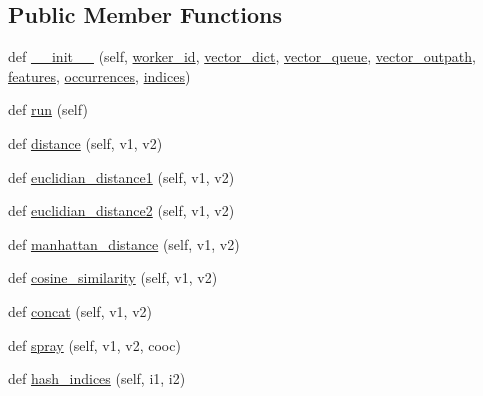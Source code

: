 \subsection*{Public Member Functions}
\begin{DoxyCompactItemize}
\item 
def \hyperlink{classsrc_1_1mapping_1_1mapthreading_1_1_mapping_worker_thread_a369abd1822eee49c2a800bf80939ca63}{\+\_\+\+\_\+init\+\_\+\+\_\+} (self, \hyperlink{classsrc_1_1mapping_1_1mapthreading_1_1_mapping_worker_thread_a31a9d651719e7dc0c3c0655885b057f1}{worker\+\_\+id}, \hyperlink{classsrc_1_1mapping_1_1mapthreading_1_1_mapping_worker_thread_a3b681382a138a5eee92f956792f96445}{vector\+\_\+dict}, \hyperlink{classsrc_1_1mapping_1_1mapthreading_1_1_mapping_worker_thread_a64f7aadd3ef3abd74551927eaddad44c}{vector\+\_\+queue}, \hyperlink{classsrc_1_1mapping_1_1mapthreading_1_1_mapping_worker_thread_a9ee70fb431a73f6600fa8d9fcfbb1789}{vector\+\_\+outpath}, \hyperlink{classsrc_1_1mapping_1_1mapthreading_1_1_mapping_worker_thread_aef3a19d93efa561529cd8c119dd64e8d}{features}, \hyperlink{classsrc_1_1mapping_1_1mapthreading_1_1_mapping_worker_thread_a8d87ef19617f8a43ff093a075ddc6f57}{occurrences}, \hyperlink{classsrc_1_1mapping_1_1mapthreading_1_1_mapping_worker_thread_ae26274456128e01544339e9ec7c4eefb}{indices})
\item 
def \hyperlink{classsrc_1_1mapping_1_1mapthreading_1_1_mapping_worker_thread_a212107a8a9d636bb3a24d45fa4246d69}{run} (self)
\item 
def \hyperlink{classsrc_1_1mapping_1_1mapthreading_1_1_mapping_worker_thread_aa77a8323d55e45dcded08d8e685394fc}{distance} (self, v1, v2)
\item 
def \hyperlink{classsrc_1_1mapping_1_1mapthreading_1_1_mapping_worker_thread_a4fb8b9904cf52294558d42c1445e32a8}{euclidian\+\_\+distance1} (self, v1, v2)
\item 
def \hyperlink{classsrc_1_1mapping_1_1mapthreading_1_1_mapping_worker_thread_a66a6db871ae1b09af299153adfa800eb}{euclidian\+\_\+distance2} (self, v1, v2)
\item 
def \hyperlink{classsrc_1_1mapping_1_1mapthreading_1_1_mapping_worker_thread_a1a7bb52cba2f7bb5f498992e1bc0bef3}{manhattan\+\_\+distance} (self, v1, v2)
\item 
def \hyperlink{classsrc_1_1mapping_1_1mapthreading_1_1_mapping_worker_thread_a7dcb7d6ab0262ca2816d51653673e142}{cosine\+\_\+similarity} (self, v1, v2)
\item 
def \hyperlink{classsrc_1_1mapping_1_1mapthreading_1_1_mapping_worker_thread_a0c029daa0905f4a7741759a7ce50f2be}{concat} (self, v1, v2)
\item 
def \hyperlink{classsrc_1_1mapping_1_1mapthreading_1_1_mapping_worker_thread_ab15fd47a94c7a2ed04b3ad3213cf1d34}{spray} (self, v1, v2, cooc)
\item 
def \hyperlink{classsrc_1_1mapping_1_1mapthreading_1_1_mapping_worker_thread_a0fe2472fc7b1bf19687bb1c986419129}{hash\+\_\+indices} (self, i1, i2)
\end{DoxyCompactItemize}
